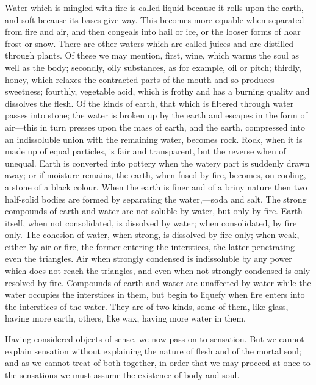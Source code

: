 Water which is mingled with fire is called liquid because it rolls upon
the earth, and soft because its bases give way. This becomes more equable
when separated from fire and air, and then congeals into hail or ice, or
the looser forms of hoar frost or snow. There are other waters which are
called juices and are distilled through plants. Of these we may mention,
first, wine, which warms the soul as well as the body; secondly, oily
substances, as for example, oil or pitch; thirdly, honey, which relaxes
the contracted parts of the mouth and so produces sweetness; fourthly,
vegetable acid, which is frothy and has a burning quality and dissolves
the flesh. Of the kinds of earth, that which is filtered through water
passes into stone; the water is broken up by the earth and escapes in the
form of air—this in turn presses upon the mass of earth, and the
earth, compressed into an indissoluble union with the remaining water,
becomes rock. Rock, when it is made up of equal particles, is fair and
transparent, but the reverse when of unequal. Earth is converted into
pottery when the watery part is suddenly drawn away; or if moisture
remains, the earth, when fused by fire, becomes, on cooling, a stone of a
black colour. When the earth is finer and of a briny nature then two
half-solid bodies are formed by separating the water,—soda and salt.
The strong compounds of earth and water are not soluble by water, but only
by fire. Earth itself, when not consolidated, is dissolved by water; when
consolidated, by fire only. The cohesion of water, when strong, is
dissolved by fire only; when weak, either by air or fire, the former
entering the interstices, the latter penetrating even the triangles. Air
when strongly condensed is indissoluble by any power which does not reach
the triangles, and even when not strongly condensed is only resolved by
fire. Compounds of earth and water are unaffected by water while the water
occupies the interstices in them, but begin to liquefy when fire enters
into the interstices of the water. They are of two kinds, some of them,
like glass, having more earth, others, like wax, having more water in
them.

Having considered objects of sense, we now pass on to sensation. But we
cannot explain sensation without explaining the nature of flesh and of the
mortal soul; and as we cannot treat of both together, in order that we may
proceed at once to the sensations we must assume the existence of body and
soul.

